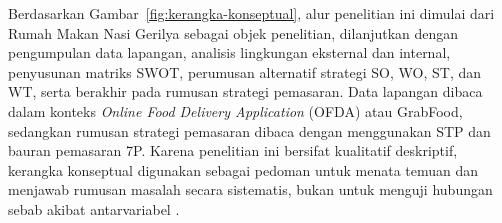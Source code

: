 Berdasarkan Gambar~\ref{fig:kerangka-konseptual}, alur penelitian ini dimulai dari Rumah Makan Nasi Gerilya sebagai objek penelitian, dilanjutkan dengan pengumpulan data lapangan, analisis lingkungan eksternal dan internal, penyusunan matriks SWOT, perumusan alternatif strategi SO, WO, ST, dan WT, serta berakhir pada rumusan strategi pemasaran. Data lapangan dibaca dalam konteks \textit{Online Food Delivery Application} (OFDA) atau GrabFood, sedangkan rumusan strategi pemasaran dibaca dengan menggunakan STP dan bauran pemasaran 7P. Karena penelitian ini bersifat kualitatif deskriptif, kerangka konseptual digunakan sebagai pedoman untuk menata temuan dan menjawab rumusan masalah secara sistematis, bukan untuk menguji hubungan sebab akibat antarvariabel \parencite{creswell2018qualitativeinquiry,miles2020qualitativedata}.

